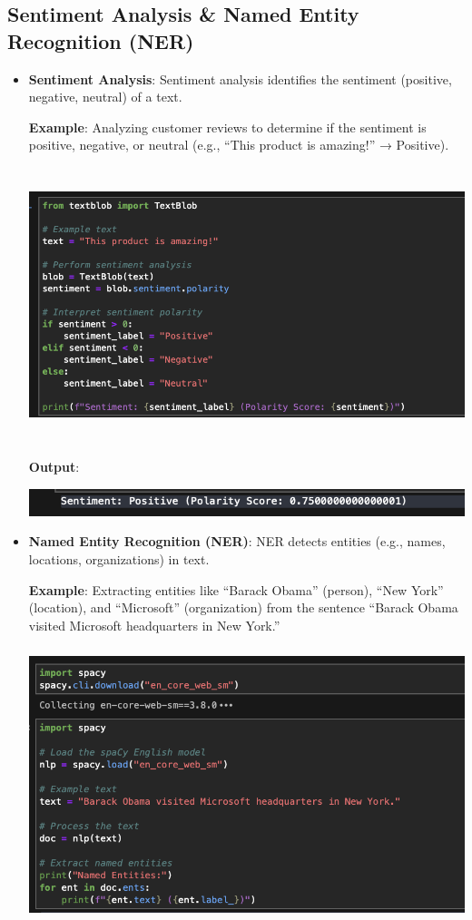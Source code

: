 \documentclass{article}
\begin{document}
\subsection{Sentiment Analysis \& Named Entity Recognition (NER)}
\begin{itemize}
\item \textbf{Sentiment Analysis}: Sentiment analysis identifies the sentiment (positive, negative, neutral) of a text.

\textbf{Example}: Analyzing customer reviews to determine if the sentiment is positive, negative, or neutral (e.g., “This product is amazing!” → Positive).

\includegraphics[width=14cm,height=8cm]{Sentiment.png}

\textbf{Output}:

\includegraphics[width=14cm,height=1
cm]{Sentiment_Output.png}
\item \textbf{Named Entity Recognition (NER)}: NER detects entities (e.g., names, locations, organizations) in text.

\textbf{Example}: Extracting entities like “Barack Obama” (person), “New York” (location), and “Microsoft” (organization) from the sentence “Barack Obama visited Microsoft headquarters in New York.”

\includegraphics[width=14cm,height=8cm]{NER.png}


\end{itemize}
\end{document}

